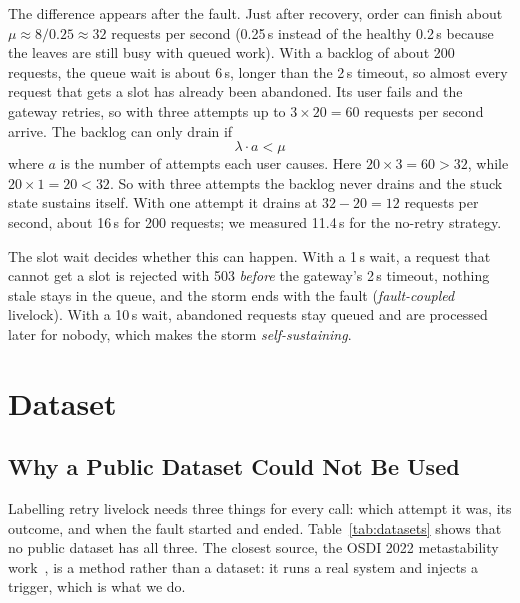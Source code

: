 \documentclass[conference,a4paper]{IEEEtran}
\begin{document}
The difference appears after the fault. Just after recovery, order can finish about $\mu \approx 8/0.25 \approx 32$ requests per second (0.25\,s instead of the healthy 0.2\,s because the leaves are still busy with queued work). With a backlog of about 200 requests, the queue wait is about 6\,s, longer than the 2\,s timeout, so almost every request that gets a slot has already been abandoned. Its user fails and the gateway retries, so with three attempts up to $3 \times 20 = 60$ requests per second arrive. The backlog can only drain if
\begin{equation}
\lambda \cdot a < \mu
\label{eq:exit}
\end{equation}
where $a$ is the number of attempts each user causes. Here $20 \times 3 = 60 > 32$, while $20 \times 1 = 20 < 32$.
So with three attempts the backlog never drains and the stuck state sustains itself. With one attempt it drains at $32-20=12$ requests per second, about 16\,s for 200 requests; we measured 11.4\,s for the no-retry strategy.

The slot wait decides whether this can happen. With a 1\,s wait, a request that cannot get a slot is rejected with 503 \emph{before} the gateway's 2\,s timeout, nothing stale stays in the queue, and the storm ends with the fault (\emph{fault-coupled} livelock). With a 10\,s wait, abandoned requests stay queued and are processed later for nobody, which makes the storm \emph{self-sustaining}.

\section{Dataset}
\label{sec:data}

\subsection{Why a Public Dataset Could Not Be Used}
Labelling retry livelock needs three things for every call: which attempt it was, its outcome, and when the fault started and ended. Table~\ref{tab:datasets} shows that no public dataset has all three. The closest source, the OSDI 2022 metastability work~\cite{huang2022}, is a method rather than a dataset: it runs a real system and injects a trigger, which is what we do.
\end{document}
